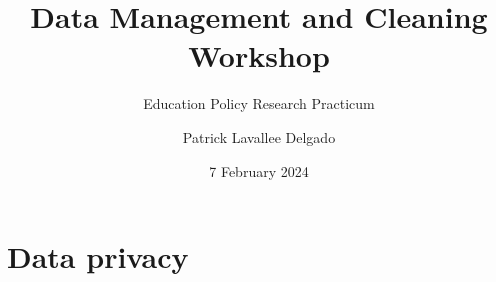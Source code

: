 \documentclass{beamer}
\title{Data Management and Cleaning Workshop}
\subtitle{Education Policy Research Practicum}
\author{Patrick Lavallee Delgado}
\institute{University of Pennsylvania Graduate School of Education}
\date{7 February 2024}
\begin{document}
{
  \begin{frame}
    \titlepage
  \end{frame}
}

\section{Data privacy}
\end{document}
